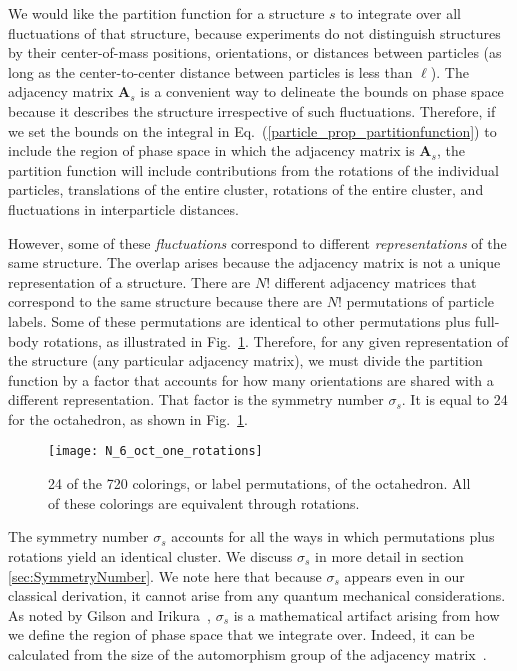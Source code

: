 \documentclass[pre, aps, twocolumn, reprint, amsmath,amssymb, showpacs,
superscriptaddress] {revtex4-1}
\begin{document}
We would like the partition function for a structure $s$ to integrate
over all fluctuations of that structure, because experiments do not
distinguish structures by their center-of-mass positions, orientations,
or distances between particles (as long as the center-to-center distance
between particles is less than $\ell$). The adjacency matrix
$\mathbf{A}_s$ is a convenient way to delineate the bounds on phase
space because it describes the structure irrespective of such
fluctuations. Therefore, if we set the bounds on the integral in
Eq.~(\ref{particle_prop_partitionfunction}) to include the region of
phase space in which the adjacency matrix is $\mathbf{A}_s$, the
partition function will include contributions from the rotations of the
individual particles, translations of the entire cluster, rotations of
the entire cluster, and fluctuations in interparticle distances.

However, some of these \emph{fluctuations} correspond to different
\emph{representations} of the same structure. The overlap arises because
the adjacency matrix is not a unique representation of a structure.
There are $N!$ different adjacency matrices that correspond to the same
structure because there are $N!$ permutations of particle labels. Some
of these permutations are identical to other permutations plus full-body
rotations, as illustrated in Fig.~\ref{fig:Octahedron_Colorings}.
Therefore, for any given representation of the structure (any particular
adjacency matrix), we must divide the partition function by a factor
that accounts for how many orientations are shared with a different
representation. That factor is the symmetry number $\sigma_s$. It is
equal to 24 for the octahedron, as shown in
Fig.~\ref{fig:Octahedron_Colorings}.

\begin{figure}
	\begin{centering}
    \texttt{[image: N\_6\_oct\_one\_rotations]}
	\caption{24 of the 720 colorings, or label permutations, of the
    octahedron. All of these colorings are equivalent through
    rotations.
    \label{fig:Octahedron_Colorings}}
	\end{centering}
\end{figure}

The symmetry number $\sigma_s$ accounts for all the ways in which
permutations plus rotations yield an identical cluster. We discuss
$\sigma_s$ in more detail in section \ref{sec:SymmetryNumber}. We note
here that because $\sigma_s$ appears even in our classical derivation,
it cannot arise from any quantum mechanical considerations. As noted by
Gilson and Irikura~\cite{gilson_symmetry_2010}, $\sigma_s$ is a
mathematical artifact arising from how we define the region of phase
space that we integrate over. Indeed, it can be calculated from the size
of the automorphism group of the adjacency
matrix~\cite{arkus_deriving_2011}.
\end{document}
